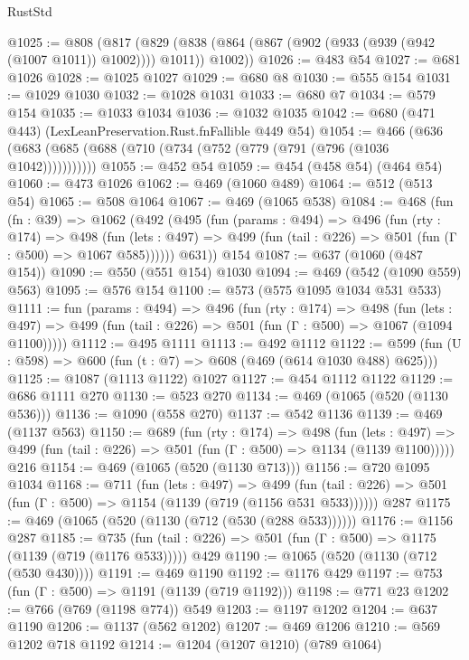 \begin{lexlean}{RustStd}
\begin{coremodule}
{\begin{coremodule}
{{{{{{@1025 := @808
    (@817 (@829 (@838 (@864 (@867 (@902 (@933 (@939 (@942 (@1007 @1011)) @1002)))) @1011)) @1002))
@1026 := @483 @54
@1027 := @681 @1026
@1028 := @1025 @1027
@1029 := @680 @8
@1030 := @555 @154
@1031 := @1029 @1030
@1032 := @1028 @1031
@1033 := @680 @7
@1034 := @579 @154
@1035 := @1033 @1034
@1036 := @1032 @1035
@1042 := @680 (@471 @443) (LexLeanPreservation.Rust.fnFallible @449 @54)
@1054 := @466 (@636 (@683 (@685 (@688 (@710 (@734 (@752 (@779 (@791 (@796 (@1036 @1042)))))))))))
@1055 := @452 @54
@1059 := @454 (@458 @54) (@464 @54)
@1060 := @473 @1026
@1062 := @469 (@1060 @489)
@1064 := @512 (@513 @54)
@1065 := @508 @1064
@1067 := @469 (@1065 @538)
@1084 := @468
    (fun (fn : @39) =>
    @1062
      (@492
        (@495
          (fun (params : @494) =>
          @496
            (fun (rty : @174) =>
            @498
              (fun (lets : @497) =>
              @499 (fun (tail : @226) => @501 (fun (Γ : @500) => @1067 @585))))))
        @631))
    @154
@1087 := @637 (@1060 (@487 @154))
@1090 := @550 (@551 @154) @1030
@1094 := @469 (@542 (@1090 @559) @563)
@1095 := @576 @154
@1100 := @573 (@575 @1095 @1034 @531 @533)
@1111 := fun (params : @494) =>
  @496
    (fun (rty : @174) =>
    @498
      (fun (lets : @497) =>
      @499 (fun (tail : @226) => @501 (fun (Γ : @500) => @1067 (@1094 @1100)))))
@1112 := @495 @1111
@1113 := @492 @1112
@1122 := @599 (fun (U : @598) => @600 (fun (t : @7) => @608 (@469 (@614 @1030 @488) @625)))
@1125 := @1087 (@1113 @1122) @1027
@1127 := @454 @1112 @1122
@1129 := @686 @1111 @270
@1130 := @523 @270
@1134 := @469 (@1065 (@520 (@1130 @536)))
@1136 := @1090 (@558 @270)
@1137 := @542 @1136
@1139 := @469 (@1137 @563)
@1150 := @689
    (fun (rty : @174) =>
    @498
      (fun (lets : @497) =>
      @499 (fun (tail : @226) => @501 (fun (Γ : @500) => @1134 (@1139 @1100)))))
    @216
@1154 := @469 (@1065 (@520 (@1130 @713)))
@1156 := @720 @1095 @1034
@1168 := @711
    (fun (lets : @497) =>
    @499 (fun (tail : @226) => @501 (fun (Γ : @500) => @1154 (@1139 (@719 (@1156 @531 @533))))))
    @287
@1175 := @469 (@1065 (@520 (@1130 (@712 (@530 (@288 @533))))))
@1176 := @1156 @287
@1185 := @735 (fun (tail : @226) => @501 (fun (Γ : @500) => @1175 (@1139 (@719 (@1176 @533))))) @429
@1190 := @1065 (@520 (@1130 (@712 (@530 @430))))
@1191 := @469 @1190
@1192 := @1176 @429
@1197 := @753 (fun (Γ : @500) => @1191 (@1139 (@719 @1192)))
@1198 := @771 @23
@1202 := @766 (@769 (@1198 @774)) @549
@1203 := @1197 @1202
@1204 := @637 @1190
@1206 := @1137 (@562 @1202)
@1207 := @469 @1206
@1210 := @569 @1202 @718 @1192
@1214 := @1204 (@1207 @1210) (@789 @1064)
}}}}}}
\end{coremodule}}
\end{coremodule}
\end{lexlean}

